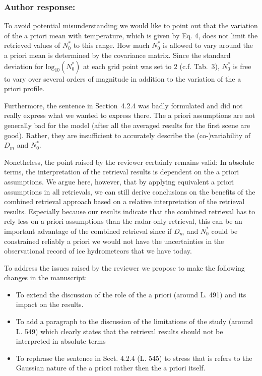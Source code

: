 \documentclass[11pt]{scrartcl}
\begin{document}
\subsubsection*{Author response:}

To avoid potential misunderstanding we would like to point out that the
variation of the a priori mean with temperature, which is given by Eq. 4, does
not limit the retrieved values of $N_0^*$ to this range. How much $N_0^*$ is
allowed to vary around the a priori mean is determined by the covariance matrix.
Since the standard deviation for $\text{log}_{10}(N_0^*)$ at each grid point was
set to $2$ (c.f. Tab.~3), $N_0^*$ is free to vary over several orders of
magnitude in addition to the variation of the a priori profile.

Furthermore, the sentence in Section~4.2.4 was badly formulated and did not
really express what we wanted to express there. The a priori assumptions are not
generally bad for the model (after all the averaged results for the first scene
are good). Rather, they are insufficient to accurately describe the
(co-)variability of $D_m$ and $N_0^*$.

Nonetheless, the point raised by the reviewer certainly remains valid: In
absolute terms, the interpretation of the retrieval results is dependent on the
a priori assumptions. We argue here, however, that by applying equivalent a
priori assumptions in all retrievals, we can still derive conclusions on the
benefits of the combined retrieval approach based on a relative interpretation
of the retrieval results. Especially because our results indicate that the
combined retrieval has to rely less on a priori assumptions than the radar-only
retrieval, this can be an important advantage of the combined retrieval since
if $D_m$ and $N_0^*$ could be constrained reliably a priori we would not have
the uncertainties in the observational record of ice hydrometeors that we have
today.

To address the issues raised by the reviewer we propose to make the following
changes in the manuscript:

\begin{itemize}
\item To extend the discussion of the role of the a priori (around L. 491) and
  its impact on the results.
\item To add a paragraph to the discussion of the limitations of the study
  (around L. 549) which clearly states that the retrieval results should not be
  interpreted in absolute terms
\item To rephrase the sentence in Sect. 4.2.4 (L. 545) to stress that is refers
  to the Gaussian nature of the a priori rather then the a priori itself.
\end{itemize}
\end{document}
